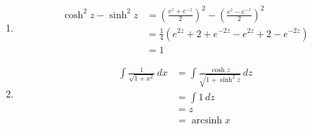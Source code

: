 \documentclass{article}
\newcommand{\arcsinh}{\operatorname{arcsinh}}
\begin{document}
\begin{enumerate}
  \item

        \begin{align*}
          \cosh^2 z - \sinh^2 z & = \left( \frac{e^z + e^{-z}}{2} \right)^2 - \left( \frac{e^z - e^{-z}}{2} \right)^2 \\
                                & = \frac{1}{4} (e^{2 z} + 2 + e^{-2 z} - e^{2 z} + 2 - e^{-2 z})                     \\
                                & = 1
        \end{align*}

  \item

        \begin{align*}
          \int \frac{1}{\sqrt{1 + x^2}} \,d x & = \int \frac{\cosh z}{\sqrt{1 + \sinh^2 z}} \,d z \\
                                              & = \int 1 \,d z                                    \\
                                              & = z                                               \\
                                              & = \arcsinh x
        \end{align*}
\end{enumerate}

\setcounter{subsection}{34}
\subsection{}
\end{document}
